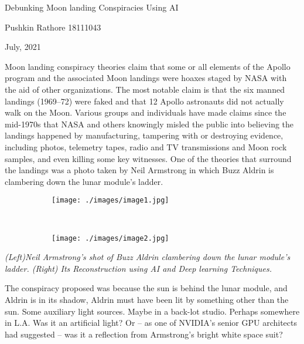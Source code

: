 \documentclass[12pt]{article}
\begin{document}
\begin{center}
{\Large Debunking Moon landing Conspiracies Using AI }
\end{center}


\begin{center}
{\large Pushkin Rathore 18111043}
\end{center}


\begin{center}
{\large July, 2021}
\end{center}


Moon landing conspiracy theories claim that some or all elements of the Apollo program and the associated Moon landings were hoaxes staged by NASA with the aid of other organizations. The most notable claim is that the six manned landings (1969–72) were faked and that 12 Apollo astronauts did not actually walk on the Moon. Various groups and individuals have made claims since the mid-1970s that NASA and others knowingly misled the public into believing the landings happened by manufacturing, tampering with or destroying evidence, including photos, telemetry tapes, radio and TV transmissions and Moon rock samples, and even killing some key witnesses. One of the theories that surround the landings was a photo taken by Neil Armstrong in which Buzz Aldrin is clambering down the lunar module’s ladder.

\begin{center}
\begin{figure}[H]
\centering
\begin{subfigure}[b]{0.45\textwidth}
\centering
\texttt{[image: ./images/image1.jpg]}
\end{subfigure}
\hfill
\ \ \ \ \ \begin{subfigure}[b]{0.45\textwidth}
\centering
\texttt{[image: ./images/image2.jpg]}
\end{subfigure}
\end{figure}

\end{center}


\begin{center}
\textit{(Left)Neil Armstrong’s shot of Buzz Aldrin clambering down the lunar module’s ladder. (Right) Its Reconstruction using AI and Deep learning Techniques.}
\end{center}


The conspiracy proposed was because the sun is behind the lunar module, and Aldrin is in its shadow, Aldrin must have been lit by something other than the sun. Some auxiliary light sources. Maybe in a back-lot studio. Perhaps somewhere in L.A. Was it an artificial light? Or – as one of NVIDIA’s senior GPU architects had suggested – was it a reflection from Armstrong’s bright white space suit? 
\end{document}
